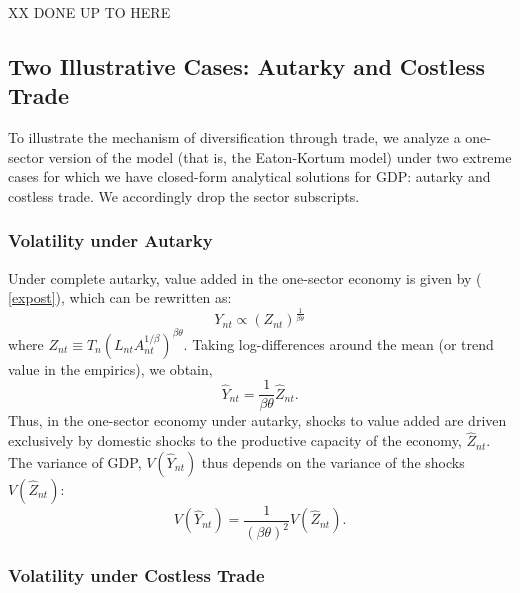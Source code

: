 \documentclass[12pt]{article}
\begin{document}
XX DONE UP TO HERE

\subsection{Two Illustrative Cases: Autarky and Costless Trade}

To illustrate the mechanism of diversification through trade, we analyze a
one-sector version of the model (that is, the Eaton-Kortum model) under two
extreme cases for which we have closed-form analytical solutions for GDP:
autarky and costless trade. We accordingly drop the sector subscripts.

\subsubsection{Volatility under Autarky}

Under complete autarky, value added in the one-sector economy is given by (%
\ref{expost}), which can be rewritten as: 
\begin{equation*}
Y_{nt}\propto \left( Z_{nt}\right) ^{\frac{1}{\beta \theta }}
\end{equation*}
where $Z_{nt}\equiv T_{n}\left( L_{nt}A_{nt}^{1/\beta }\right)^{\beta\theta
} $. Taking log-differences around the mean (or trend value in the
empirics), we obtain, 
\begin{equation*}
\hat{Y}_{nt}=\frac{1}{\beta \theta }\hat{Z}_{nt}.
\end{equation*}
Thus, in the one-sector economy under autarky, shocks to value added are
driven exclusively by domestic shocks to the productive capacity of the
economy, $\hat{Z}_{nt}.$ The variance of GDP, $V(\hat{Y}_{nt})$ thus depends
on the variance of the shocks $V(\hat{Z}_{nt})$: 
\begin{equation*}
V(\hat{Y}_{nt})=\frac{1}{\left( \beta \theta \right) ^{2}}V(\hat{Z}_{nt}).
\end{equation*}

\subsubsection{Volatility under Costless Trade}
\end{document}

